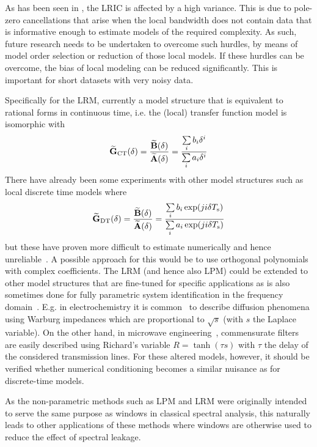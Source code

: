     As has been seen in , the \gls{LRIC} is affected by a high variance.
    This is due to pole-zero cancellations that arise when the local bandwidth does not contain data that is informative enough to estimate models of the required complexity.
    As such, future research needs to be undertaken to overcome such hurdles, by means of model order selection or reduction of those local models.
    If these hurdles can be overcome, the bias of local modeling can be reduced significantly.
    This is important for short datasets with very noisy data.

    Specifically for the \gls{LRM}, currently a model structure that is equivalent to rational forms in continuous time, i.e. the (local) transfer function model is isomorphic with
    \begin{equation}
      \LocalModel[\CT]{G}(\dW) 
      = \frac{\LocalModel{B}(\dW)}{\LocalModel{A}(\dW)}
      = \frac{\Sum_i  b_i \dW^{i}}{\Sum_i  a_i \dW^{i}}
    \end{equation}
    There have already been some experiments with other model structures such as local discrete time models where
    \begin{equation}
      \LocalModel[\DT]{G}(\dW) 
      = \frac{\LocalModel{B}(\dW)}{\LocalModel{A}(\dW)}
      = \frac{\Sum_i  b_i \exp (ji\dW\Ts)}{\Sum_i  a_i \exp (ji\dW\Ts) }
    \end{equation}
    but these have proven more difficult to estimate numerically and hence unreliable~\citep[Section 2.4]{Pintelon2006BJ1}.
    A possible approach for this would be to use orthogonal polynomials~\citep{Forsythe1957,Bultheel2005} with complex coefficients.
    The \gls{LRM} (and hence also \gls{LPM}) could be extended to other model structures that are fine-tuned for specific applications as is also sometimes done for fully parametric system identification in the frequency domain~\citep[p. 179]{Pintelon2012}.
    E.g. in electrochemistry it is common~\citep{Wang1987} to describe diffusion phenomena using Warburg impedances which are proportional to $\sqrt{s}$ (with $s$ the Laplace variable).
    On the other hand, in microwave engineering~\citep{Rizzi1988,Pozar2005}, commensurate filters are easily described using Richard's variable $R=\tanh (\tau s)$ with $\tau$ the delay of the considered transmission lines.
    For these altered models, however, it should be verified whether numerical conditioning becomes a similar nuisance as for discrete-time models.

    As the non-parametric methods such as \gls{LPM} and \gls{LRM} were originally intended to serve the same purpose as windows in classical spectral analysis, this naturally leads to other applications of these methods where windows are otherwise used to reduce the effect of spectral leakage.

